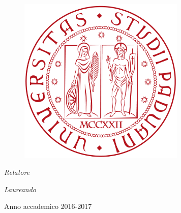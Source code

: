 
\begin{titlepage}
	\thispagestyle{empty}
	\begin{center}
		
		\vspace{4cm}
		{\scshape\LARGE \univname}\\\vspace{0.7cm} %
		\textsc{\Large \deptname}\\[0.5cm] %
		\textsc{\large \facname}
		
		\vspace{2cm}
		\begin{figure}[H]
			\begin{center}
				\includegraphics[height=8cm]{Immagini/logo}
			\end{center}
		\end{figure}
		\vspace{2cm}
		
		
		{\huge \bfseries \ttitle} %
		
		\vspace{2cm}
		
		\begin{minipage}[t]{0.49\textwidth}
			\begin{flushleft} \large
				\emph{Relatore} \\
				\supname %
			\end{flushleft}
		\end{minipage}
%
		\begin{minipage}[t]{0.49\textwidth}
			\vspace{1cm}
			\begin{flushright} \large
				\emph{Laureando}\\
				\authorname %
			\end{flushright}
		\end{minipage}
	
		\vspace{1cm}
		{\large Anno accademico 2016-2017}\\[4cm] %
		
	\end{center}
\end{titlepage}